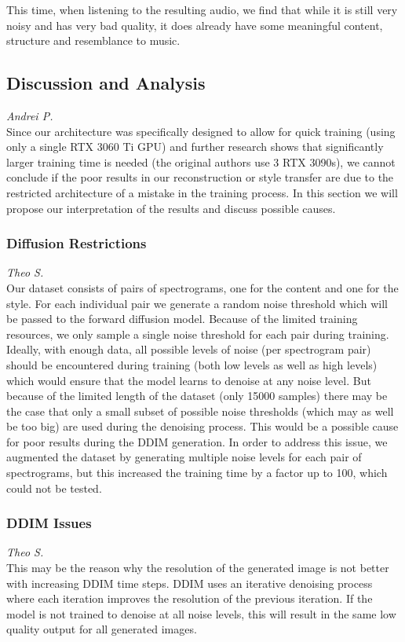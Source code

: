 This time, when listening to the resulting audio, we find that while it is still 
very noisy and has very bad quality, it does already have some meaningful content, structure and resemblance to music.


\subsection{Discussion and Analysis}
\textit{Andrei P.}\\
Since our architecture was specifically designed to allow for quick training (using only a single RTX 3060 Ti GPU) and further research shows that significantly larger training time is needed (the original authors use 3 RTX 3090s), we cannot conclude if the poor results in our reconstruction or style transfer are due to the restricted architecture of a mistake in the training process. In this section we will propose our interpretation of the results and discuss possible causes.

\subsubsection{Diffusion Restrictions}
\textit{Theo S.}\\
Our dataset consists of pairs of spectrograms, one for the content and one for the style. For each individual pair we generate a random noise threshold which will be passed to the forward diffusion model. Because of the limited training resources, we only sample a single noise threshold for each pair during training. Ideally, with enough data, all possible levels of noise (per spectrogram pair) should be encountered during training (both low levels as well as high levels) which would ensure that the model learns to denoise at any noise level. But because of the limited length of the dataset (only 15000 samples) there may be the case that only a small subset of possible noise thresholds (which may as well be too big) are used during the denoising process. This would be a possible cause for poor results during the DDIM generation. In order to address this issue, we augmented the dataset by generating multiple noise levels for each pair of spectrograms, but this increased the training time by a factor up to 100, which could not be tested.

\subsubsection{DDIM Issues}
\textit{Theo S.}\\
This may be the reason why the resolution of the generated image is not better with increasing DDIM time steps. DDIM uses an iterative denoising process where each iteration improves the resolution of the previous iteration. If the model is not trained to denoise at all noise levels, this will result in the same low quality output for all generated images.








